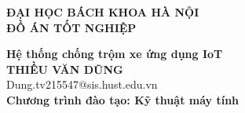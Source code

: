 \documentclass[DoAn.tex]{subfiles}
\begin{document}
\begin{titlepage}
\thispagestyle{empty}
\begin{center}

{\textbf{\large{ĐẠI HỌC BÁCH KHOA HÀ NỘI}}}\\[4cm]

{\textbf{\huge{ ĐỒ ÁN TỐT NGHIỆP}}}\\[1cm]
{\textbf{\Large{Hệ thống chống trộm xe ứng dụng IoT}}\\[1cm]

{\textbf{\large{THIỀU VĂN DŨNG}}}\\
{\large{Dung.tv215547@sis.hust.edu.vn}}\\[0.5cm]

{\textbf{\large{Chương trình đào tạo: Kỹ thuật máy tính
}}}\\

\vspace{4cm}
\begin{table}[H]
\centering
{}
\end{table}}
\end{center}



\end{titlepage}
\end{document}
